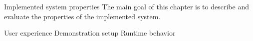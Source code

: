 \chap Implemented system properties
The main goal of this chapter is to describe and evaluate the properties of the implemented system.

\sec User experience
\sec Demonstration setup
\sec Runtime behavior